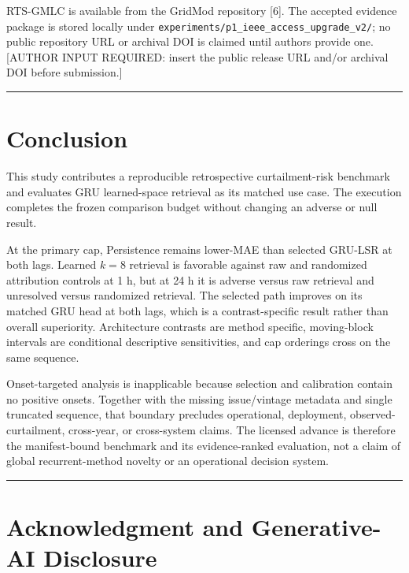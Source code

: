 \documentclass{ieeeaccess}
\begin{document}
RTS-GMLC is available from the GridMod repository {[}6{]}. The accepted evidence package is stored locally under \texttt{experiments/p1\_ieee\_access\_upgrade\_v2/}; no public repository URL or archival DOI is claimed until authors provide one. {[}AUTHOR INPUT REQUIRED: insert the public release URL and/or archival DOI before submission.{]}

\begin{center}\rule{0.5\linewidth}{0.5pt}\end{center}

\section{Conclusion}\label{conclusion}

This study contributes a reproducible retrospective curtailment-risk benchmark and evaluates GRU learned-space retrieval as its matched use case. The execution completes the frozen comparison budget without changing an adverse or null result.

At the primary cap, Persistence remains lower-MAE than selected GRU-LSR at both lags. Learned \(k=8\) retrieval is favorable against raw and randomized attribution controls at 1 h, but at 24 h it is adverse versus raw retrieval and unresolved versus randomized retrieval. The selected path improves on its matched GRU head at both lags, which is a contrast-specific result rather than overall superiority. Architecture contrasts are method specific, moving-block intervals are conditional descriptive sensitivities, and cap orderings cross on the same sequence.

Onset-targeted analysis is inapplicable because selection and calibration contain no positive onsets. Together with the missing issue/vintage metadata and single truncated sequence, that boundary precludes operational, deployment, observed-curtailment, cross-year, or cross-system claims. The licensed advance is therefore the manifest-bound benchmark and its evidence-ranked evaluation, not a claim of global recurrent-method novelty or an operational decision system.

\begin{center}\rule{0.5\linewidth}{0.5pt}\end{center}

\section{Acknowledgment and Generative-AI Disclosure}\label{acknowledgment-and-generative-ai-disclosure}
\end{document}
